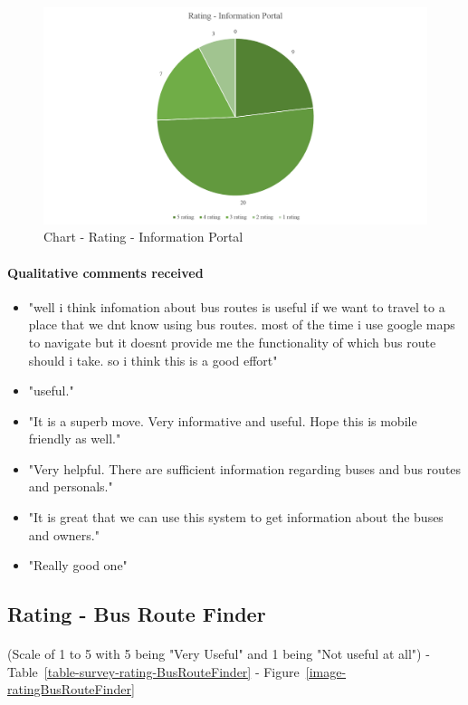 \begin {figure} [H]
\centering
\includegraphics [scale=0.6] {ratingInformationPortal}
\caption [Chart - Rating - Information Portal] {Chart - Rating - Information Portal}
\label {image-ratingInformationPortal}
\end {figure}

\paragraph{Qualitative comments received}
\begin {itemize}
\item "well i think infomation about bus routes is useful if we want to travel to a place that we dnt know using bus routes. most of the time i use google maps to navigate but it doesnt provide me the functionality of which bus route should i take. so i think this is a good effort"
\item "useful."
\item "It is a superb move. Very informative and useful. Hope this is mobile friendly as well."
\item "Very helpful. There are sufficient information regarding buses and bus routes and personals."
\item "It is great that we can use this system to get information about the buses and owners."
\item "Really good one"
\end {itemize}



\subsection{Rating - Bus Route Finder} 

\paragraph{} (Scale of 1 to 5 with 5 being "Very Useful" and 1 being "Not useful at all") - Table~\ref{table-survey-rating-BusRouteFinder} - Figure~\ref{image-ratingBusRouteFinder}

